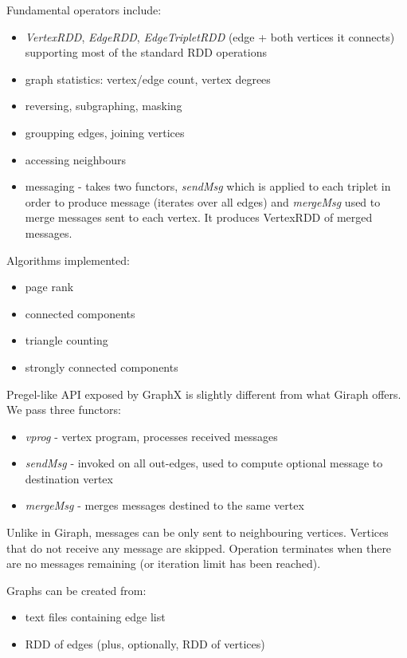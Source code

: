 \noindent
Fundamental operators include:
\begin{itemize}
    \item \textit{VertexRDD}, \textit{EdgeRDD}, \textit{EdgeTripletRDD} (edge + both vertices it connects) supporting most of the standard RDD operations
    \item graph statistics: vertex/edge count, vertex degrees
    \item reversing, subgraphing, masking
    \item groupping edges, joining vertices
    \item accessing neighbours
    \item messaging - takes two functors, \textit{sendMsg} which is applied to each triplet in order to produce message (iterates over all edges) and \textit{mergeMsg} used to merge messages sent to each vertex. It produces VertexRDD of merged messages.
\end{itemize}

\noindent
Algorithms implemented:
\begin{itemize}
    \item page rank
    \item connected components
    \item triangle counting
    \item strongly connected components
\end{itemize}

\noindent
Pregel-like API exposed by GraphX is slightly different from what Giraph offers. We pass three functors:
\begin{itemize}
    \item \textit{vprog} - vertex program, processes received messages
    \item \textit{sendMsg} - invoked on all out-edges, used to compute optional message to destination vertex
    \item \textit{mergeMsg} - merges messages destined to the same vertex
\end{itemize}
Unlike in Giraph, messages can be only sent to neighbouring vertices.
Vertices that do not receive any message are skipped. Operation terminates when there are no messages remaining (or iteration limit has been reached).

\noindent
Graphs can be created from:
\begin{itemize}
    \item text files containing edge list
    \item RDD of edges (plus, optionally, RDD of vertices)
\end{itemize}

